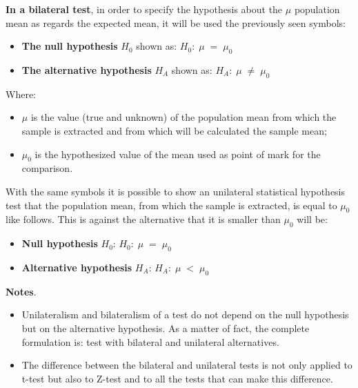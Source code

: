 \begin{frame}
  \vspace*{.25cm}
  \textbf{In a bilateral test}, in order to specify the hypothesis about the $ \mu $ population mean as regards the expected mean, it will be used the previously seen symbols:
  \vspace*{.25cm}
  \begin{itemize}
    \item \textbf{The null hypothesis} {\boldmath$H_0$} shown as: \hspace*{1.3cm} $H_0: \; \mu \; = \; \mu_0 $\\
    \item \textbf{The alternative hypothesis} {\boldmath$H_A$} shown as: $ H_A: \; \mu \; \ne \; \mu_0$\\
  \end{itemize}
  \vspace*{.25cm}
  Where:\\
  \vspace*{.25cm}
  \begin{itemize}
    \item $ \mu $ is the value (true and unknown) of the population mean from which the sample is extracted and from which will be calculated the sample mean;
    \vspace*{.25cm}
    \item $ \mu_0 $  is the hypothesized value of the mean used as point of mark for the comparison.
  \end{itemize}
\end{frame}

\begin{frame}
  \vspace*{.25cm}
  With the same symbols it is possible to show an unilateral statistical hypothesis test that the population mean, from which the sample is extracted, is equal to $\mu_0$ like follows. This is against the alternative that it is smaller than $\mu_0$ will be:
  \begin{itemize}
    \item \textbf{Null hypothesis} {\boldmath $ H_0 $}:  \hspace*{1.45cm} $ H_0: \; \mu \; =\; \mu_0 $\\
    \item \textbf{Alternative hypothesis} {\boldmath $ H_A $}: \hspace*{.15cm} $ H_A: \; \mu \; <\; \mu_0 $\\
  \end{itemize}
  \vspace*{.25cm}
  \textbf{Notes}.
  \begin{itemize}
    \item Unilateralism and bilateralism of a test do not depend on the null hypothesis but on the alternative hypothesis. As a matter of fact, the complete formulation is: test with bilateral and unilateral alternatives.
    \item The difference between the bilateral and unilateral tests is not only applied to t-test but also to Z-test and to all the tests that can make this difference.
  \end{itemize}
\end{frame}

